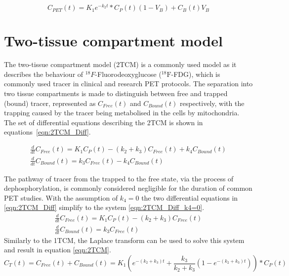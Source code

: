 \begin{equation}
   C_{PET}(t) =   K_1 e^{-k_2 t} \ast C_P(t) (1-V_B) + C_B(t) V_B
  \label{eqn:1TCM_CPET}
\end{equation}


\section{Two-tissue compartment model}
The two-tissue compartment model (2TCM) is a commonly used model as it describes the behaviour of ${}^{18}F$-Fluorodeoxyglucose (${}^{18}\mathrm{F}$-FDG), which is commonly used tracer in clinical and research PET protocols. The separation into two tissue compartments is made to distinguish between free and trapped (bound) tracer, represented as $C_{Free}(t)$ and $C_{Bound}(t)$ respectively, with the trapping caused by the tracer being metabolised in the cells by mitochondria. The set of differential equations describing the 2TCM is shown in equations~\ref{eqn:2TCM_Diff}.

\begin{subequations}
\begin{align}
\frac{d}{dt}C_{Free}(t) = K_1 C_P(t) - (k_2 + k_3)C_{Free}(t) + k_4 C_{Bound}(t) \\ 
\frac{d}{dt}C_{Bound}(t) = k_3 C_{Free}(t) - k_4 C_{Bound}(t)  
\end{align}
\label{eqn:2TCM_Diff}
\end{subequations}

The pathway of tracer from the trapped to the free state, via the process of dephosphorylation, is commonly considered negligible for the duration of common PET studies. With the assumption of $k_4=0$ the two differential equations in \ref{eqn:2TCM_Diff} simplify to the system \ref{eqn:2TCM_Diff_k4=0}. 
\begin{subequations}
\begin{align}
\frac{d}{dt}C_{Free}(t) = K_1 C_P(t) - (k_2 + k_3)C_{Free}(t) \\ 
\frac{d}{dt}C_{Bound}(t) = k_3 C_{Free}(t)  
\end{align}
\label{eqn:2TCM_Diff_k4=0}
\end{subequations}
Similarly to the 1TCM, the Laplace transform can be used to solve this system and result in equation \ref{eqn:2TCM}.
\begin{equation}
C_T(t) =  C_{Free}(t) + C_{Bound}(t) = K_1 ( e^{-(k_2+k_3)t} + \frac{k_3}{k_2+k_3}(1-e^{-(k_2+k_3)t})) \ast C_P(t)   
\label{eqn:2TCM}
\end{equation}

